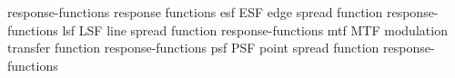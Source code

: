 \newglsXterm%
{response-functions}%
{response functions}%
{\nopostdesc}%
\newglsXacronym%
{esf}%
{ESF}%
{edge spread function}%
{\nopostdesc}%
{response-functions}%
\newglsXacronym%
{lsf}%
{LSF}%
{line spread function}%
{\nopostdesc}%
{response-functions}%
\newglsXacronym%
{mtf}%
{MTF}%
{modulation transfer function}%
{\nopostdesc}%
{response-functions}%
\newglsXacronym%
{psf}%
{PSF}%
{point spread function}%
{\nopostdesc}%
{response-functions}%
